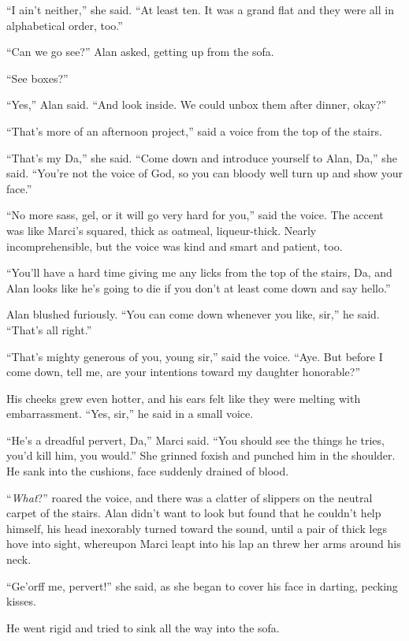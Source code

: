 ``I ain't neither,'' she said.  ``At least ten.  It was a grand flat
and they were all in alphabetical order, too.''

``Can we go see?'' Alan asked, getting up from the sofa.

``See boxes?''

``Yes,'' Alan said.  ``And look inside.  We could unbox them after
dinner, okay?''

``That's more of an afternoon project,'' said a voice from the top of
the stairs.

``That's my Da,'' she said.  ``Come down and introduce yourself to
Alan, Da,'' she said.  ``You're not the voice of God, so you can
bloody well turn up and show your face.''

``No more sass, gel, or it will go very hard for you,'' said the
voice.  The accent was like Marci's squared, thick as oatmeal,
liqueur-thick.  Nearly incomprehensible, but the voice was kind and
smart and patient, too.

``You'll have a hard time giving me any licks from the top of the
stairs, Da, and Alan looks like he's going to die if you don't at
least come down and say hello.''

Alan blushed furiously.  ``You can come down whenever you like, sir,''
he said.  ``That's all right.''

``That's mighty generous of you, young sir,'' said the voice.  ``Aye. 
But before I come down, tell me, are your intentions toward my
daughter honorable?''

His cheeks grew even hotter, and his ears felt like they were melting
with embarrassment.  ``Yes, sir,'' he said in a small voice.

``He's a dreadful pervert, Da,'' Marci said.  ``You should see the
things he tries, you'd kill him, you would.'' She grinned foxish and
punched him in the shoulder.  He sank into the cushions, face suddenly
drained of blood.

``\textit{What}?'' roared the voice, and there was a clatter of
slippers on the neutral carpet of the stairs.  Alan didn't want to
look but found that he couldn't help himself, his head inexorably
turned toward the sound, until a pair of thick legs hove into sight,
whereupon Marci leapt into his lap an threw her arms around his neck.

``Ge'orff me, pervert!'' she said, as she began to cover his face in
darting, pecking kisses.

He went rigid and tried to sink all the way into the sofa.

